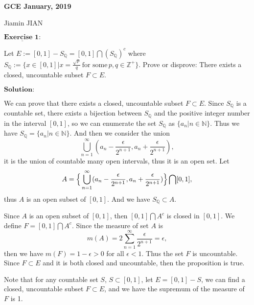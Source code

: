 \documentclass[12pt,a4paper]{ctexart}
\begin{document}
\begin{center}
\textbf{ GCE January, 2019}
\vspace{8pt}

Jiamin JIAN
\end{center}

\vspace{12pt}

$\underline{\textbf{Exercise 1:}}$

Let $E:= [0, 1] - S_{\mathbb{Q}} = [0, 1] \bigcap (S_{\mathbb{Q}})^{c}$ where $S_{\mathbb{Q}} := \{x \in [0, 1] | x = \frac{\sqrt{p}}{q}   \,  \text{for some} \, p, q \in \mathbb{Z}^{+} \}$. Prove or disprove: There exists a closed, uncountable subset $F \subset E$.

\vspace{8pt}

$\textbf{Solution:}$

We can prove that there exists a closed, uncountable subset $F \subset E$. Since $S_{\mathbb{Q}}$ is a countable set, there exists a bijection between $S_{\mathbb{Q}}$ and the positive integer number in the interval $[0, 1]$, so we can enumerate the set $S_{\mathbb{Q}}$ as $\{a_{n} | n \in \mathbb{N} \}$. Thus we have $S_{\mathbb{Q}} = \{a_{n} | n \in \mathbb{N} \}$. And then we consider the union 
$$\bigcup_{n = 1}^{\infty}(a_{n} - \frac{\epsilon}{2^{n+1}}, a_{n} + \frac{\epsilon}{2^{n+1}}),$$
it is the union of countable many open intervals, thus it is an open set. Let
$$A = \Big{\{} \bigcup_{n = 1}^{\infty}(a_{n} - \frac{\epsilon}{2^{n+1}}, a_{n} + \frac{\epsilon}{2^{n+1}}) \Big{\}}\bigcap [0,1],$$
thus $A$ is an open subset of $[0,1]$. And we have $S_{\mathbb{Q}} \subset A$.

Since $A$ is an open subset of $[0,1]$, then $[0, 1] \bigcap A^c$ is closed in $[0,1]$. We define $F = [0, 1] \bigcap A^{c}$. Since the measure of set $A$ is
\begin{equation*}
    m(A) = 2 \sum_{n = 1}^{\infty}  \frac{\epsilon}{2^{n+1}} = \epsilon,
\end{equation*}
then we have $m(F) = 1 - \epsilon > 0$ for all $\epsilon < 1$. Thus the set $F$ is uncountable. Since $F \subset E$ and it is both closed and uncountable, then the proposition is true.

Note that for any countable set $S$, $S \subset [0, 1]$, let $E = [0, 1] - S$, we can find a closed, uncountable subset $F \subset E$, and we have the supremum of the measure of $F$ is 1.


\newpage
\end{document}
